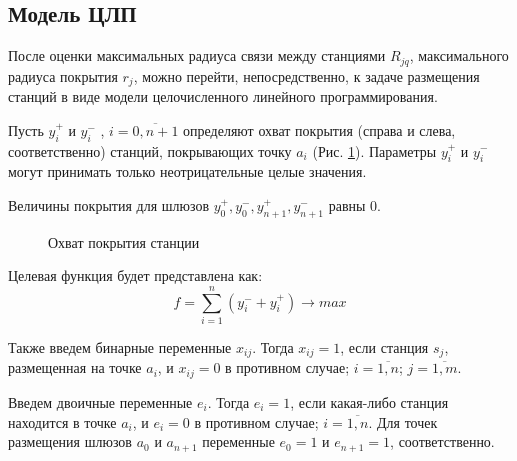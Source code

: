 


\subsection{Модель ЦЛП}

После оценки максимальных радиуса связи между станциями $R_{jq}$, максимального радиуса покрытия $r_j$, можно перейти, непосредственно, к задаче размещения станций в виде модели целочисленного линейного программирования.

Пусть $y_i^+$ и $y_i^-$ , $i= \overline{0,n+1}$ определяют охват покрытия (справа и слева, соответственно) станций, покрывающих точку $a_i$ (Рис. \cref{fig:part3_station_coverage}). Параметры $y_i^+$ и $y_i^-$ могут принимать только неотрицательные целые значения.

Величины  покрытия для шлюзов $y_0^+, y_0^-, y_{n+1}^+, y_{n+1}^-$ равны 0.

\begin{figure}[ht]
  \caption{Охват покрытия станции}\label{fig:part3_station_coverage}
\end{figure}
 
Целевая функция будет представлена как:
\begin{equation}
  \label{eq:part3_objective_function}
  f =  \sum\limits_{i=1}^n (y_i^- + y_i^+) \rightarrow max
\end{equation}

Также введем бинарные переменные $x_{ij}$. Тогда $x_{ij}=1$, если станция $s_j$, размещенная на точке $a_i$, и $x_{ij}=0$ в противном случае; $i= \overline{1, n}$; $j = \overline{1,m}$.

Введем двоичные переменные $ e_i $. Тогда $ e_i = 1 $, если какая-либо станция находится в точке $ a_i $, и $ e_i = 0$  в противном случае; $ i = \overline {1, n} $. Для точек размещения шлюзов $ a_0 $ и $a_{n + 1}$ переменные $ e_0 = 1 $ и $ e_{n + 1} =1 $, соответственно. 

